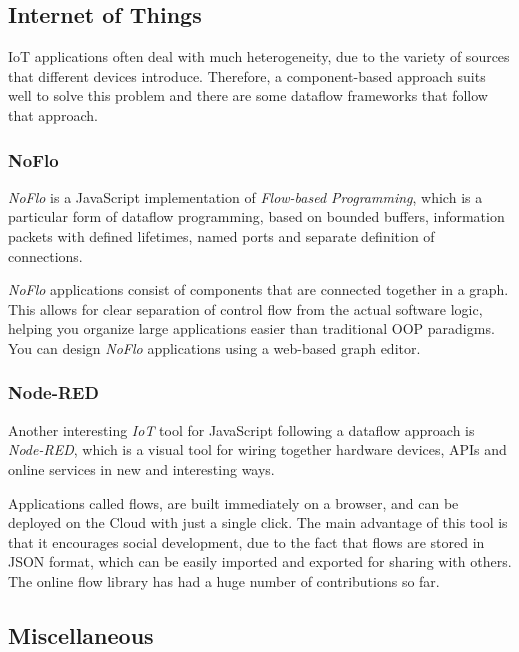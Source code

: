 \documentclass[sigplan,review,anonymous]{acmart}
\begin{document}
\subsection{Internet of Things}

IoT applications often deal with much heterogeneity, due to the variety of
sources that different devices introduce. Therefore, a component-based approach
suits well to solve this problem and there are some dataflow frameworks that
follow that approach.

\subsubsection{NoFlo}

\textit{NoFlo} is a JavaScript implementation of
\textit{Flow-based Programming}\cite{fbp}, which is a particular form of dataflow
programming, based on bounded buffers, information packets with defined
lifetimes, named ports and separate definition of connections.

\textit{NoFlo} applications consist of components that are connected together in
a graph. This allows for clear separation of control flow from the actual
software logic, helping you organize large applications easier than traditional
OOP paradigms. You can design \textit{NoFlo} applications using a web-based
graph editor.

\subsubsection{Node-RED}

Another interesting \textit{IoT} tool for JavaScript following a dataflow
approach is \textit{Node-RED}\cite{node-red}, which is a visual tool for wiring
together hardware devices, APIs and online services in new and interesting ways.

Applications called flows, are built immediately on a browser, and can be
deployed on the Cloud with just a single click. The main advantage of this tool
is that it encourages social development, due to the fact that flows are stored
in JSON format, which can be easily imported and exported for sharing with
others. The online flow library has had a huge
number of contributions so far.

\subsection{Miscellaneous}
\end{document}
